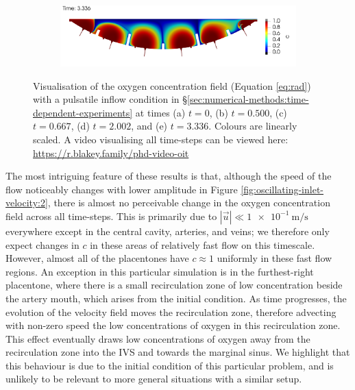 \begin{figure}
\begin{subfigure}{\textwidth}
                \caption{}
                \label{fig:oscillating-inlet-transport:4}
            \end{subfigure}
            \begin{subfigure}{\textwidth}
                \includegraphics[width=\textwidth]{diagrams/results-modelling/velocity-transport-oscillating/placenta-transport/transport.0100.png}
                \caption{}
                \label{fig:oscillating-inlet-transport:5}
            \end{subfigure}
            \caption{Visualisation of the oxygen concentration field (Equation \eqref{eq:rad}) with a pulsatile inflow condition in \S\ref{sec:numerical-methods:time-dependent-experiments} at times (a) $t=0$, (b) $t=0.500$, (c) $t=0.667$, (d) $t=2.002$, and (e) $t=3.336$. Colours are linearly scaled. A video visualising all time-steps can be viewed here: \url{https://r.blakey.family/phd-video-oit}}
            \label{fig:oscillating-inlet-transport}
        \end{figure}

        The most intriguing feature of these results is that, although the speed of the flow noticeably changes with lower amplitude in Figure \ref{fig:oscillating-inlet-velocity:2}, there is almost no perceivable change in the oxygen concentration field across all time-steps. This is primarily due to $|\vec{u}| \ll \qty{1e-1}{\metre\per\second}$ everywhere except in the central cavity, arteries, and veins; we therefore only expect changes in $c$ in these areas of relatively fast flow on this timescale. However, almost all of the placentones have $c \approx 1$ uniformly in these fast flow regions. An exception in this particular simulation is in the furthest-right placentone, where there is a small recirculation zone of low concentration beside the artery mouth, which arises from the initial condition. As time progresses, the evolution of the velocity field moves the recirculation zone, therefore advecting with non-zero speed the low concentrations of oxygen in this recirculation zone. This effect eventually draws low concentrations of oxygen away from the recirculation zone into the IVS and towards the marginal sinus. We highlight that this behaviour is due to the initial condition of this particular problem, and is unlikely to be relevant to more general situations with a similar setup.

